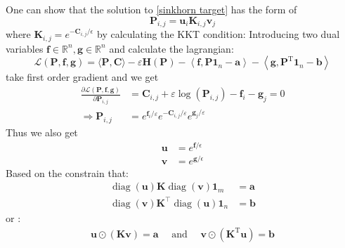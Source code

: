 \documentclass{article}
\begin{document}
\begin{large}
One can show that the solution to \ref{sinkhorn target} has the form of 
\begin{equation}
\mathbf { P } _ { i , j } = \mathbf { u } _ { i } \mathbf { K } _ { i , j } \mathbf { v } _ { j }
\end{equation}
where $\mathbf { K } _ { i , j } = e^{-\mathbf{C}_{i,j}/\epsilon}$ by calculating the KKT condition:
Introducing two dual variables $\mathbf { f } \in \mathbb { R } ^ { n } , \mathbf { g } \in \mathbb { R } ^ { n }$ and calculate the lagrangian:
\begin{equation}
\mathcal { L } ( \mathbf { P } , \mathbf { f } , \mathbf { g } ) = \langle \mathbf { P } , \mathbf { C } \rangle - \varepsilon \mathbf { H } ( \mathbf { P } ) - \left\langle \mathbf { f } , \mathbf { P } \mathbf { 1 } _ { n } - \mathbf { a } \right\rangle - \left\langle \mathbf { g } , \mathbf { P } ^ { \mathrm { T } } \mathbf{ 1 } _ { n } - \mathbf { b } \right\rangle
\end{equation}
take first order gradient and we get
\begin{align}
\frac { \partial \mathcal { L } ( \mathbf { P } , \mathbf { f } , \mathbf { g } ) } { \partial \mathbf { P } _ { i , j } } &= \mathbf { C } _ { i , j } + \varepsilon \log \left( \mathbf { P } _ { i , j } \right) - \mathbf { f } _ { i } - \mathbf { g } _ { j } = 0\\
\Rightarrow\mathbf { P } _ { i , j } &= e ^ { \mathbf { f } _ { i } / \varepsilon } e ^ { - \mathbf { C } _ { i , j } / \varepsilon } e ^ { \mathbf { g } _ { j } / \varepsilon }
\label{solution for P}
\end{align}
Thus we also get
\begin{align}
\mathbf{u} &= e^{\mathbf{f}/\epsilon}\\
\mathbf{v} &= e^{\mathbf{g}/\epsilon}
\end{align}
Based on the constrain that:
\begin{align}
\operatorname { diag } ( \mathbf { u } ) \mathbf { K } \operatorname { diag } ( \mathbf { v } ) \mathbf { 1 } _ { m } &= \mathbf { a }\\
\operatorname { diag } ( \mathbf { v } ) \mathbf { K } ^ { \top } \operatorname { diag } ( \mathbf { u } ) \mathbf { 1 } _ { n } &= \mathbf { b }
\end{align}
or :
\begin{align}
\mathbf { u } \odot ( \mathbf { K } \mathbf { v } ) = \mathbf { a } \quad \text { and } \quad \mathbf { v } \odot \left( \mathbf { K } ^ { \mathrm { T } } \mathbf { u } \right) = \mathbf { b }

\end{align}
\end{large}
\end{document}
